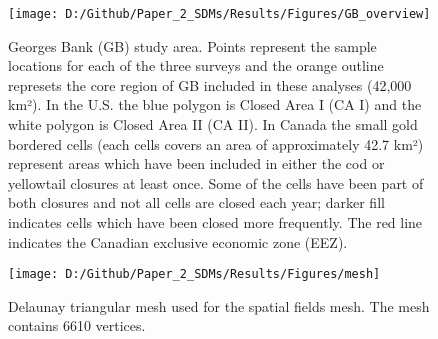 \documentclass[
]{article}
\begin{document}
\begin{figure}
\texttt{[image: D:/Github/Paper\_2\_SDMs/Results/Figures/GB\_overview]} \caption{Georges Bank (GB) study area.  Points represent the sample locations for each of the three surveys and the orange outline represets the core region of GB included in these analyses (42,000 km²).  In the U.S. the blue polygon is Closed Area I (CA I) and the white polygon is Closed Area II (CA II). In Canada the small gold bordered cells (each cells covers an area of approximately 42.7 km²) represent areas which have been included in either the cod or yellowtail closures at least once.  Some of the cells have been part of both closures and not all cells are closed each year; darker fill indicates cells which have been closed more frequently. The red line indicates the Canadian exclusive economic zone (EEZ).}\label{fig:Overview}
\end{figure}

\clearpage
\begin{figure}
\texttt{[image: D:/Github/Paper\_2\_SDMs/Results/Figures/mesh]} \caption{Delaunay triangular mesh used for the spatial fields mesh. The mesh contains 6610 vertices.}\label{fig:Mesh}
\end{figure}
\end{document}
